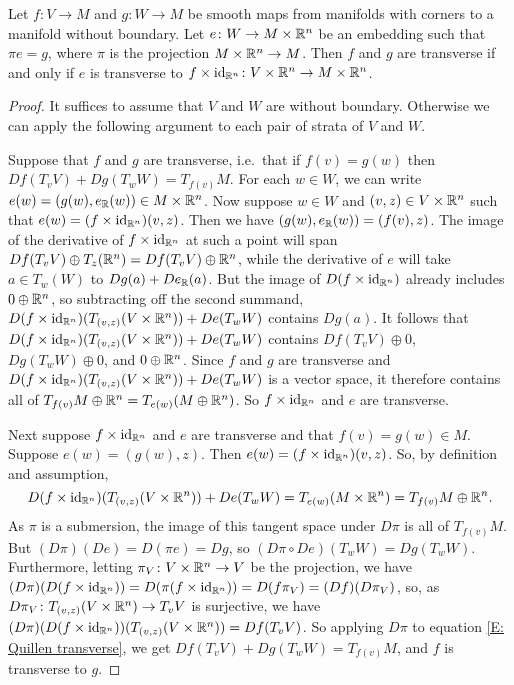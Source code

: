 \begin{lemma}\label{L: all transversality is wrt embeddings}
	Let $f \colon V \to M$ and $g \colon W \to M$ be smooth maps from manifolds with corners to a manifold without boundary.
	Let $e \colon W \to M \times \mathbb{R}^n$ be an embedding such that $\pi e = g$, where $\pi$ is the projection $M \times \mathbb{R}^n \to M$.
	Then $f$ and $g$ are transverse if and only if $e$ is transverse to $f \times \mathrm{id}_{\mathbb{R}^n} \colon V \times \mathbb{R}^n \to M \times \mathbb{R}^n$.
\end{lemma}

\begin{proof}
	It suffices to assume that $V$ and $W$ are without boundary.
	Otherwise we can apply the following argument to each pair of strata of $V$ and $W$.

	Suppose that $f$ and $g$ are transverse, i.e.\ that if $f(v) = g(w)$ then $Df(T_vV)+Dg(T_wW) = T_{f(v)}M$.
	For each $w \in W$, we can write $e(w) = (g(w),e_{\mathbb{R}}(w)) \in M \times \mathbb{R}^n$.
	Now suppose $w \in W$ and $(v,z) \in V \times \mathbb{R}^n$ such that $e(w) = (f \times \mathrm{id}_{\mathbb{R}^n})(v,z)$.
	Then we have $(g(w),e_{\mathbb{R}}(w)) = (f(v),z)$.
	The image of the derivative of $f \times \mathrm{id}_{\mathbb{R}^n}$ at such a point will span $Df(T_vV) \oplus T_z(\mathbb{R}^{n}) = Df(T_vV) \oplus \mathbb{R}^{n}$, while the derivative of $e$ will take $a \in T_w(W)$ to $Dg(a)+ De_{\mathbb{R}}(a)$.
	But the image of $D(f \times \mathrm{id}_{\mathbb{R}^n})$ already includes $0 \oplus \mathbb{R}^{n}$, so subtracting off the second summand, $D(f \times \mathrm{id}_{\mathbb{R}^{n}})(T_{(v,z)}(V \times \mathbb{R}^n))+De(T_wW)$ contains $Dg(a)$.
	It follows that $D(f \times \mathrm{id}_{\mathbb{R}^{n}})(T_{(v,z)}(V \times \mathbb{R}^n))+De(T_wW)$ contains $Df(T_vV) \oplus 0$, $Dg(T_wW) \oplus 0$, and $0 \oplus \mathbb{R}^n$.
	Since $f$ and $g$ are transverse and $D(f \times \mathrm{id}_{\mathbb{R}^{n}})(T_{(v,z)}(V \times \mathbb{R}^n))+De(T_wW)$ is a vector space, it therefore contains all of $T_{f(v)}M \oplus \mathbb{R}^n = T_{e(w)}(M \oplus \mathbb{R}^n)$.
	So $f \times \mathrm{id}_{\mathbb{R}^n}$ and $e$ are transverse.

	Next suppose $f \times \mathrm{id}_{\mathbb{R}^n}$ and $e$ are transverse and that $f(v) = g(w) \in M$.
	Suppose $e(w) = (g(w),z)$.
	Then $e(w) = (f \times \mathrm{id}_{\mathbb{R}^n})(v,z)$.
	So, by definition and assumption,
	\begin{equation}\label{E: Quillen transverse}
		D(f \times \mathrm{id}_{\mathbb{R}^{n}})(T_{(v,z)}(V \times \mathbb{R}^n))+De(T_wW) = T_{e(w)}(M \times \mathbb{R}^n) = T_{f(v)}M \oplus \mathbb{R}^n.
	\end{equation}
	As $\pi$ is a submersion, the image of this tangent space under $D\pi$ is all of $T_{f(v)}M$.
	But $(D\pi)(De) = D(\pi e) = Dg$, so $(D\pi \circ De)(T_wW) = Dg(T_wW)$.
	Furthermore, letting $\pi_V \colon V \times \mathbb{R}^n \to V$ be the projection, we have $(D\pi)(D(f \times \mathrm{id}_{\mathbb{R}^{n}})) = D(\pi(f \times \mathrm{id}_{\mathbb{R}^{n}})) = D(f\pi_V) = (Df)(D\pi_V)$, so, as $D\pi_V \colon T_{(v,z)}(V \times \mathbb{R}^n) \to T_vV$ is surjective, we have $(D\pi)(D(f \times \mathrm{id}_{\mathbb{R}^{n}}))(T_{(v,z)}(V \times \mathbb{R}^n)) = Df(T_vV)$.
	So applying $D\pi$ to equation \eqref{E: Quillen transverse}, we get $Df(T_vV)+Dg(T_wW) = T_{f(v)}M$, and $f$ is transverse to $g$.
\end{proof}

